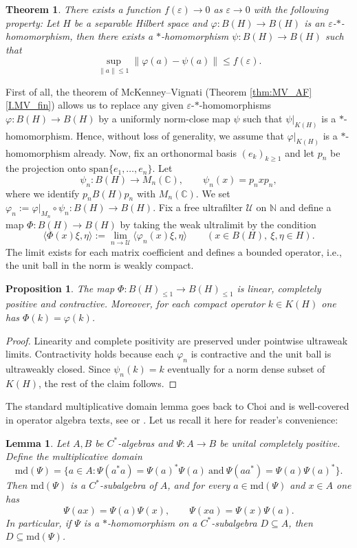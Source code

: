 \documentclass[11pt]{amsproc}
\newcommand{\BH}{B(H)}
\newcommand{\bbC}{\mathbb C}
\theoremstyle{definition}
\theoremstyle{plain}
\newtheorem{lemma}[definition]{Lemma}
\newtheorem{proposition}[definition]{Proposition}
\newtheorem{theorem}[definition]{Theorem}
\theoremstyle{remark}
\begin{document}
\begin{theorem}
There exists a function $f(\varepsilon)\to 0$ as $\varepsilon\to 0$ with the following property: Let $H$ be a separable Hilbert space and $\varphi\colon B(H) \to B(H)$ is an $\varepsilon$-$*$-homomorphism, then there exists a $*$-homomorphism $\psi\colon B(H)\to B(H)$ such that
\[\sup_{\|a\|\le 1}\|\varphi(a)-\psi(a)\|\le f(\varepsilon).\]
\end{theorem}

First of all, the  theorem of McKenney--Vignati (Theorem \ref{thm:MV_AF}\eqref{I.MV_fin}) allows us to replace any given $\varepsilon$-$*$-homomorphisms $\varphi \colon B(H) \to B(H)$ by a uniformly norm-close map $\psi$ such that $\psi|_{K(H)}$ is a $*$-homomorphism. Hence, without loss of generality, we assume that $\varphi|_{K(H)}$ is a $*$-homomorphism already. Now, fix an orthonormal basis $(e_k)_{k\ge1}$ and 
let $p_n$ be the projection onto $\mathrm{span}\{e_1,\dots,e_n\}$. Let
\[
\psi_n:\BH\to M_n(\bbC),\qquad \psi_n(x)=p_nxp_n,
\]
where we identify $p_n\BH p_n$ with $M_n(\bbC)$. We set $\varphi_n := \varphi|_{M_n} \circ \psi_n \colon \BH \to \BH$. Fix a free ultrafilter $\mathcal{U}$ on $\mathbb{N}$ and define a map $\Phi:\BH\to\BH$ by taking the weak ultralimit by the condition
\[
\langle \Phi(x)\xi,\eta\rangle := \lim_{n\to\mathcal{U}} \langle \varphi_n(x)\xi,\eta\rangle
\qquad (x\in\BH,\ \xi,\eta\in H).
\]
The limit exists for each matrix coefficient and defines a bounded operator, i.e., the unit ball in the norm is weakly compact.

\begin{proposition}
The map $\Phi: \BH_{\le 1}\to \BH_{\le 1}$ is linear, completely positive and contractive.
Moreover, for each compact operator $k\in K(H)$ one has $\Phi(k)=\varphi(k)$.
\end{proposition}

\begin{proof}
Linearity and complete positivity are preserved under pointwise ultraweak limits.
Contractivity holds because each $\varphi_n$ is contractive and the unit ball is ultraweakly closed. Since $\psi_n(k) = k$ eventually for a norm dense subset of $K(H)$, the rest of the claim follows.
\end{proof}

The standard multiplicative domain lemma goes back to Choi and is well-covered in operator algebra texts, see \cite[\S3]{Paulsen} or \cite{Choi74}. Let us recall it here for reader's convenience:

\begin{lemma}\label{lem:md}
Let $A,B$ be $C^*$-algebras and $\Psi\colon A\to B$ be unital completely positive.
Define the multiplicative domain
\[\mathrm{md}(\Psi)=\{a\in A: \Psi(a^*a)=\Psi(a)^*\Psi(a)\ \text{and}\ \Psi(aa^*)=\Psi(a)\Psi(a)^*\}.\]
Then $\mathrm{md}(\Psi)$ is a $C^*$-subalgebra of $A$, and for every $a\in\mathrm{md}(\Psi)$ and $x\in A$ one has
\[\Psi(ax)=\Psi(a)\Psi(x),\qquad \Psi(xa)=\Psi(x)\Psi(a).\]
In particular, if $\Psi$ is a $*$-homomorphism on a $C^*$-subalgebra $D\subseteq A$, then $D\subseteq \mathrm{md}(\Psi)$.
\end{lemma}
\end{document}
